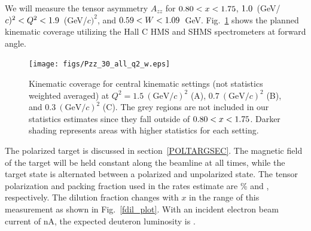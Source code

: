 




\label{EXP}
We will measure the tensor asymmetry $A_{zz}$ for $0.80<x<1.75$, $1.0$~(GeV/$c)^2 < Q^2 <1.9$~(GeV/$c)^2$, and $0.59 < W < 1.09$~GeV. Fig.~\ref{kincov} shows the planned kinematic coverage utilizing the Hall C HMS and SHMS spectrometers at forward angle.

\begin{figure}
\begin{center}
\texttt{[image: figs/Pzz\_30\_all\_q2\_w.eps]}

\caption{\label{kincov} Kinematic coverage for central kinematic settings (not statistics weighted averaged) at $Q^2=1.5~(\mathrm{GeV}/c)^2$ (A), $0.7~(\mathrm{GeV}/c)^2$ (B), and $0.3~(\mathrm{GeV}/c)^2$ (C).  The grey regions are not included in our statistics estimates since they fall outside of $0.80 < x < 1.75$. Darker shading represents areas with higher statistics for each setting.}
\end{center}
\end{figure}


The polarized \TARGET target is discussed in section~\ref{POLTARGSEC}.  The magnetic field of the target will be held constant along the beamline at all times, while the target state is alternated between a polarized and unpolarized state.
The tensor polarization and packing fraction used in the rates estimate are \PZZ\% and \PF, respectively. 
The dilution fraction changes with $x$ in the range of this measurement as shown in Fig.~\ref{fdil_plot}.
With an incident electron beam current of \CURRENT nA, the expected deuteron luminosity is \LUMI.

